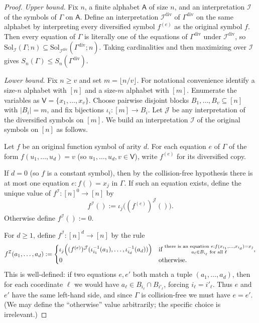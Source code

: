 \documentclass[11pt]{article}
\theoremstyle{definition}
\theoremstyle{plain}
\newcommand{\A}{\mathsf{A}}
\newcommand{\Vars}{\mathsf{V}}
\newcommand{\Sol}{\mathrm{Sol}}
\newcommand{\Sn}{S_n}
\begin{document}
\begin{proof}
\emph{Upper bound.}
Fix $n$, a finite alphabet $\A$ of size $n$, and an interpretation $\mathcal I$ of the symbols of $\Gamma$ on $\A$.
Define an interpretation $\mathcal I^{\mathrm{div}}$ of $\Gamma^{\mathrm{div}}$ on the same alphabet by
interpreting every diversified symbol $f^{(e)}$ as the original symbol $f$.
Then every equation of $\Gamma$ is literally one of the equations of $\Gamma^{\mathrm{div}}$ under
$\mathcal I^{\mathrm{div}}$, so
$\Sol_{\mathcal I}(\Gamma;n)\subseteq \Sol_{\mathcal I^{\mathrm{div}}}(\Gamma^{\mathrm{div}};n)$.
Taking cardinalities and then maximizing over $\mathcal I$ gives
$\Sn(\Gamma)\le \Sn(\Gamma^{\mathrm{div}})$.

\smallskip
\emph{Lower bound.}
Fix $n\ge v$ and set $m=\lfloor n/v\rfloor$.
For notational convenience identify a size-$n$ alphabet with $[n]$ and a size-$m$ alphabet with $[m]$.
Enumerate the variables as $\Vars=\{x_1,\dots,x_v\}$.
Choose pairwise disjoint blocks $B_1,\dots,B_v\subseteq [n]$ with $|B_i|=m$, and fix bijections
$\iota_i:[m]\to B_i$.
Let $\mathcal J$ be any interpretation of the diversified symbols on $[m]$.
We build an interpretation $\mathcal I$ of the original symbols on $[n]$ as follows.

Let $f$ be an original function symbol of arity $d$.
For each equation $e$ of $\Gamma$ of the form
$f(u_1,\dots,u_d)=v$ (so $u_1,\dots,u_d,v\in\Vars$), write $f^{(e)}$ for its diversified copy.

If $d=0$ (so $f$ is a constant symbol), then by the collision-free hypothesis there is at most
one equation $e:f()=x_j$ in $\Gamma$.
If such an equation exists, define the unique value of $f^{\mathcal I}:[n]^0\to[n]$ by
\[ f^{\mathcal I}() := \iota_j\bigl((f^{(e)})^{\mathcal J}()\bigr). \]
Otherwise define $f^{\mathcal I}():=0$.

For $d\ge 1$, define $f^{\mathcal I}:[n]^d\to [n]$ by the rule
\[
 f^{\mathcal I}(a_1,\dots,a_d)
 :=
 \begin{cases}
 \iota_j\Bigl((f^{(e)})^{\mathcal J}(\iota_{i_1}^{-1}(a_1),\dots,\iota_{i_d}^{-1}(a_d))\Bigr)
 &\text{if }\substack{\text{there is an equation }e: f(x_{i_1},\dots,x_{i_d})=x_j\\
                     a_\ell\in B_{i_\ell}\text{ for all }\ell},\\
 0 &\text{otherwise.}
 \end{cases}
\]
This is well-defined: if two equations $e,e'$ both match a tuple $(a_1,\dots,a_d)$, then for each coordinate
$\ell$ we would have $a_\ell\in B_{i_\ell}\cap B_{i'_\ell}$, forcing $i_\ell=i'_\ell$.
Thus $e$ and $e'$ have the same left-hand side, and since $\Gamma$ is collision-free we must have $e=e'$.
(We may define the ``otherwise'' value arbitrarily; the specific choice is irrelevant.)


\end{proof}
\end{document}
